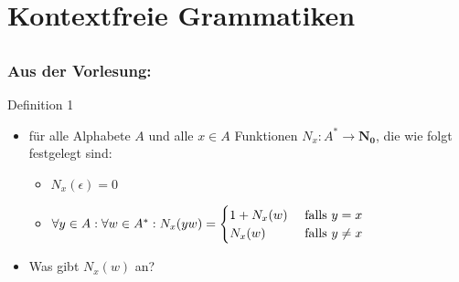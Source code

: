 

\section[Kontextfreie Grammatiken]{Kontextfreie Grammatiken}
\subsection*{}
\begin{frame}
	\frametitle{Aus der Vorlesung:}
	\begin{block}{Definition 1}
		\begin{itemize}
			\item für alle Alphabete $A$ und alle $x\in A$ Funktionen $N_x: A^* \rightarrow \mathbf{N_0}$, die wie folgt festgelegt sind:
			\begin{itemize}
				\item $N_x(\epsilon) = 0 $
				\item $\forall y\in A: \forall w\in A^*: N_x(yw) = \begin{cases}
						1+N_x(w) & \textnormal{ falls } y= x\\
      			N_x(w) & \textnormal{ falls } y\not= x\\
					\end{cases}$
			\end{itemize}
		\item Was gibt $N_x(w)$ an?
	  \end{itemize}
	\end{block}
\end{frame}
